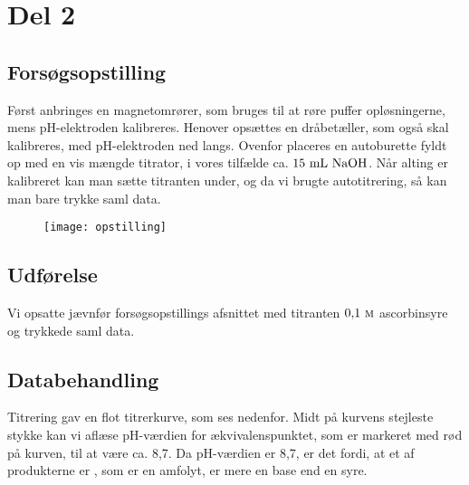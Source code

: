 \section*{Del 2}
\subsection*{Forsøgsopstilling}
Først anbringes en magnetomrører, som bruges til at røre puffer opløsningerne,
mens pH-elektroden kalibreres. Henover opsættes en dråbetæller,
som også skal kalibreres, med pH-elektroden ned langs.
Ovenfor placeres en autoburette fyldt op med en vis mængde titrator, i vores tilfælde ca. $15\ \unit{\milli\liter}\ \ce{NaOH}$.
Når alting er kalibreret kan man sætte titranten under, og da vi brugte autotitrering, så kan man bare trykke saml data.

\begin{figure}[h]
    \centering%
    \texttt{[image: opstilling]}
\end{figure}

\subsection*{Udførelse}
Vi opsatte jævnfør forsøgsopstillings afsnittet med titranten $0{,}1\ \textsc{m}$ ascorbinsyre og trykkede saml data.

\subsection*{Databehandling}
Titrering gav en flot titrerkurve, som ses nedenfor.
Midt på kurvens stejleste stykke kan vi aflæse pH-værdien for ækvivalenspunktet, som er markeret med rød på kurven, til at være ca. 8,7.
Da pH-værdien er 8,7, er det fordi,
at et af produkterne er , som er en amfolyt,
er mere en base end en syre.


